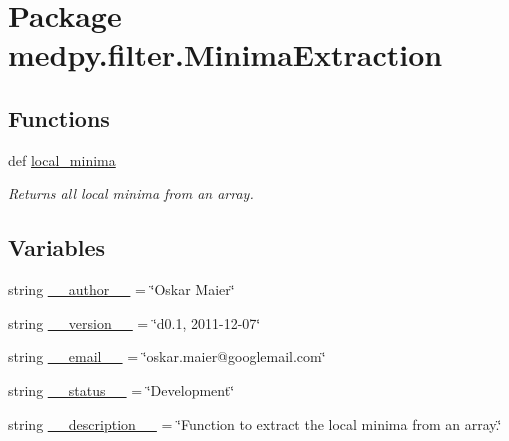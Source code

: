 \hypertarget{namespacemedpy_1_1filter_1_1MinimaExtraction}{
\section{Package medpy.filter.MinimaExtraction}
\label{namespacemedpy_1_1filter_1_1MinimaExtraction}
}
\subsection*{Functions}
\begin{DoxyCompactItemize}
\item 
def \hyperlink{namespacemedpy_1_1filter_1_1MinimaExtraction_ab8211983ebb94119a14c03e3de642daf}{local\_\-minima}
\begin{DoxyCompactList}\small\item\em Returns all local minima from an array. \end{DoxyCompactList}\end{DoxyCompactItemize}
\subsection*{Variables}
\begin{DoxyCompactItemize}
\item 
string \hyperlink{namespacemedpy_1_1filter_1_1MinimaExtraction_a059b113637c5638f67bfc96e8783fd63}{\_\-\_\-author\_\-\_\-} = \char`\"{}Oskar Maier\char`\"{}
\item 
string \hyperlink{namespacemedpy_1_1filter_1_1MinimaExtraction_a8517b3289b06606c7c3a60ef1d80afea}{\_\-\_\-version\_\-\_\-} = \char`\"{}d0.1, 2011-\/12-\/07\char`\"{}
\item 
string \hyperlink{namespacemedpy_1_1filter_1_1MinimaExtraction_a9aa117983f466c56dca7af1f00a5c4b7}{\_\-\_\-email\_\-\_\-} = \char`\"{}oskar.maier@googlemail.com\char`\"{}
\item 
string \hyperlink{namespacemedpy_1_1filter_1_1MinimaExtraction_a329b20ff88f6a7d47851b8798e61a553}{\_\-\_\-status\_\-\_\-} = \char`\"{}Development\char`\"{}
\item 
string \hyperlink{namespacemedpy_1_1filter_1_1MinimaExtraction_a16b929ea09f091b1565a67d9e64bd8f9}{\_\-\_\-description\_\-\_\-} = \char`\"{}Function to extract the local minima from an array.\char`\"{}
\end{DoxyCompactItemize}


